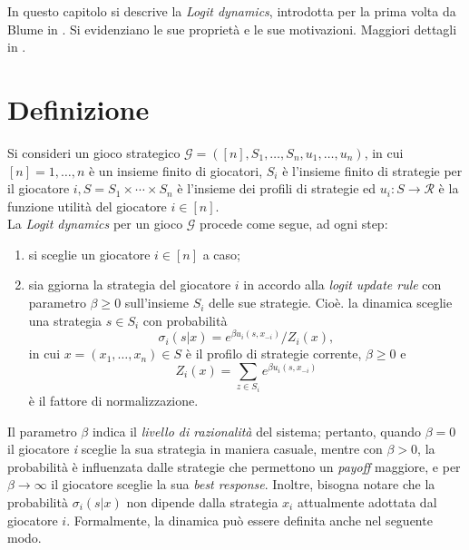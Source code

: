 In questo capitolo si descrive la \textit{Logit dynamics}, introdotta per la prima volta da Blume in \cite{blume1993statistical}. Si evidenziano le sue proprietà e le sue motivazioni. Maggiori dettagli in \cite{ferraioli2012logit}.
\section{Definizione}
Si consideri un gioco strategico $\mathcal{G} = ([n], S_1, \dots, S_n, u_1, \dots, u_n)$, in cui $[n] = {1, \dots, n}$ è un insieme finito di giocatori, $S_i$ è l'insieme finito di strategie per il giocatore $i, S = S_1 \times \cdots \times S_n$ è l'insieme dei profili di strategie ed $u_i: S \rightarrow \mathcal{R}$ è la funzione utilità del giocatore $i \in [n]$.\\
La \textit{Logit dynamics} per un gioco $\mathcal{G}$ procede come segue, ad ogni step:
\begin{enumerate}
	\item si sceglie un giocatore $i \in [n]$ a caso;
	\item sia ggiorna la strategia del giocatore $i$ in accordo alla \textit{logit update rule} con parametro $\beta \geq 0$ sull'insieme $S_i$ delle sue strategie. Cioè. la dinamica sceglie una strategia $s \in S_i$ con probabilità
	\begin{equation}
		\sigma_i (s|x) = e^{\beta u_i (s, x_{-i})}/Z_i(x),
		\label{sigmai}
	\end{equation}
	in cui $x = (x_1, \dots, x_n) \in S$ è il profilo di strategie corrente, $\beta \geq 0$ e
	\begin{equation}
		Z_i(x) = \sum_{z\in S_i}{e^{\beta u_i (s, x_{-i})}}
	\end{equation}
	è il fattore di normalizzazione.
\end{enumerate}

Il parametro $\beta$ indica il \textit{livello di razionalità} del sistema; pertanto, quando $\beta = 0$ il giocatore \textit{i} sceglie la sua strategia in maniera casuale, mentre con $\beta > 0$, la probabilità è influenzata dalle strategie che permettono un \textit{payoff} maggiore, e per $\beta \rightarrow \infty$ il giocatore sceglie la sua \textit{best response}. Inoltre, bisogna notare che la probabilità $\sigma_i (s|x)$ non dipende dalla strategia $x_i$ attualmente adottata dal giocatore $i$.
Formalmente, la dinamica può essere definita anche nel seguente modo.
